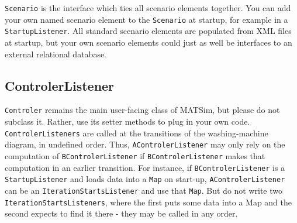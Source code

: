 \lstinline$Scenario$ is the interface which ties all scenario elements together. You can add your own named scenario element
to the \lstinline$Scenario$ at startup, for example in a \lstinline$StartupListener$. All standard scenario elements are populated
from XML files at startup, but your own scenario elements could just as well be interfaces to an external relational database.

\subsection{ControlerListener}
\label{sec:controlerListener-extension-point}
\label{sec:controlerextension}
\lstinline|Controler| remains the main user-facing class of MATSim, but please do not subclass it. Rather, use its setter methods to plug in your own code.
\lstinline|ControlerListeners| are called at the transitions of the washing-machine diagram, in undefined order.
Thus, \lstinline|AControlerListener| may only rely on the computation of \lstinline|BControlerListener| if \lstinline|BControlerListener|
 makes that computation in an earlier transition. For instance, if \lstinline|BControlerListener| is a \lstinline|StartupListener|
 and loads data into a \lstinline|Map| on start-up, \lstinline|AControlerListener| can be an \lstinline|IterationStartsListener| and use that \lstinline|Map|.
 But do not write two \lstinline|IterationStartsListeners|, where the first puts some data into a Map and the second expects to find it there - they may be called in any order.

